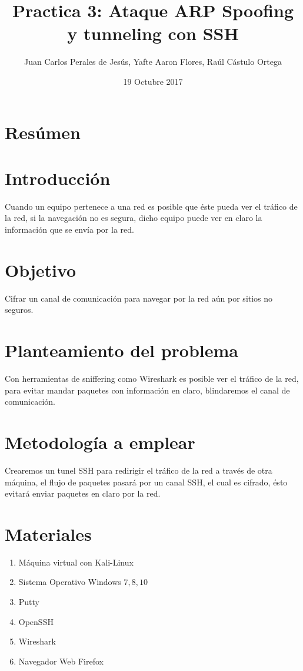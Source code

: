 \documentclass{article}
\title{Practica 3: Ataque ARP Spoofing y tunneling con SSH}
\author{Juan Carlos Perales de Jes\'us, Yafte Aaron Flores, Ra\'ul C\'astulo Ortega}
\date{19 Octubre 2017}
\begin{document}
\maketitle
\newpage

\section{Res\'umen}

\section{Introducci\'on}
Cuando un equipo pertenece a una red es posible que \'este pueda ver el tr\'afico de la red, si la navegaci\'on no es segura, dicho equipo puede ver en claro la informaci\'on que se env\'ia por la red.
 
\section{Objetivo}
Cifrar un canal de comunicaci\'on para navegar por la red a\'un por sitios no seguros.

\section{Planteamiento del problema}
Con herramientas de sniffering como Wireshark es posible ver el tr\'afico de la red, para evitar mandar paquetes con informaci\'on en claro, blindaremos el canal de comunicaci\'on.

\section{Metodolog\'ia a emplear}
Crearemos un tunel SSH para redirigir el tr\'afico de la red a trav\'es de otra m\'aquina, el flujo de paquetes pasar\'a por un canal SSH, el cual es cifrado, \'esto evitar\'a enviar paquetes en claro por la red.

\section{Materiales}
\begin{enumerate}
\item M\'aquina virtual con Kali-Linux
\item Sistema Operativo Windows \(7,8,10\)
\item Putty
\item OpenSSH
\item Wireshark
\item Navegador Web Firefox
\end{enumerate}
\end{document}
